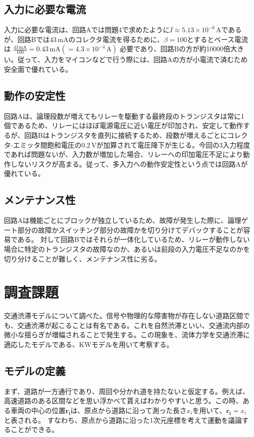 \documentclass[11pt,a4paper,twocolumn]{jsarticle}
\begin{document}
\subsection{入力に必要な電流}
入力に必要な電流は、回路Aでは問題4で求めたように$I \approx 5.13\times10^{-8}\,\mathrm{A}$であるが、回路Bでは$43\,\mathrm{mA}$のコレクタ電流を得るために、$\beta=100$とするとベース電流は $\frac{43\,\mathrm{mA}}{100}=0.43\,\mathrm{mA} (= 4.3 \times 10^{-4}\,\mathrm{A})$ 必要であり、回路Bの方が約10000倍大きい。従って、入力をマイコンなどで行う際には、回路Aの方が小電流で済むため安全面で優れている。

\subsection{動作の安定性}
回路Aは、論理段数が増えてもリレーを駆動する最終段のトランジスタは常に1個であるため、リレーにはほぼ電源電圧に近い電圧が印加され、安定して動作するが、回路Bはトランジスタを直列に接続するため、段数が増えるごとにコレクタ-エミッタ間飽和電圧の$0.2\,\mathrm{V}$が加算されて電圧降下が生じる。今回の3入力程度であれば問題ないが、入力数が増加した場合、リレーへの印加電圧不足により動作しないリスクが高まる。従って、多入力への動作安定性という点では回路Aが優れている。

\subsection{メンテナンス性}
回路Aは機能ごとにブロックが独立しているため、故障が発生した際に、論理ゲート部分の故障かスイッチング部分の故障かを切り分けてデバックすることが容易である。 対して回路Bではそれらが一体化しているため、リレーが動作しない場合に特定のトランジスタの故障なのか、あるいは前段の入力電圧不足なのかを切り分けることが難しく、メンテナンス性に劣る。

\section{調査課題}
交通渋滞モデルについて調べた。信号や物理的な障害物が存在しない道路区間でも、交通渋滞が起こることは有名である。これを自然渋滞といい、交通流内部の微小な揺らぎが増幅されることで発生する。この現象を、流体力学を交通渋滞に適応したモデルである、KWモデルを用いて考察する。

\subsection{モデルの定義}
まず、道路が一方通行であり、周回や分かれ道を持たないと仮定する。例えば、高速道路のある区間などを思い浮かべて貰えばわかりやすいと思う。この時、ある車両の中心の位置$\boldsymbol{r_i}$は、原点から道路に沿って測った長さ$x_i$を用いて、$\boldsymbol{r_i}=x_i$と表される。
すなわち、原点から道路に沿った1次元座標を考えて運動を議論することができる。
\end{document}
